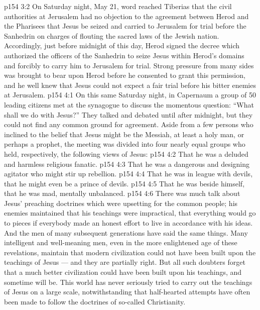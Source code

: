 \vs p154 3:2 On Saturday night, May 21, word reached Tiberias that the civil authorities at Jerusalem had no objection to the agreement between Herod and the Pharisees that Jesus be seized and carried to Jerusalem for trial before the Sanhedrin on charges of flouting the sacred laws of the Jewish nation. Accordingly, just before midnight of this day, Herod signed the decree which authorized the officers of the Sanhedrin to seize Jesus within Herod’s domains and forcibly to carry him to Jerusalem for trial. Strong pressure from many sides was brought to bear upon Herod before he consented to grant this permission, and he well knew that Jesus could not expect a fair trial before his bitter enemies at Jerusalem.
\vs p154 4:1 On this same Saturday night, in Capernaum a group of 50 leading citizens met at the synagogue to discuss the momentous question: “What shall we do with Jesus?” They talked and debated until after midnight, but they could not find any common ground for agreement. Aside from a few persons who inclined to the belief that Jesus might be the Messiah, at least a holy man, or perhaps a prophet, the meeting was divided into four nearly equal groups who held, respectively, the following views of Jesus:
\vs p154 4:2 \bibnobreakspace That he was a deluded and harmless religious fanatic.
\vs p154 4:3 \bibnobreakspace That he was a dangerous and designing agitator who might stir up rebellion.
\vs p154 4:4 \bibnobreakspace That he was in league with devils, that he might even be a prince of devils.
\vs p154 4:5 \bibnobreakspace That he was beside himself, that he was mad, mentally unbalanced.
\vs p154 4:6 \pc There was much talk about Jesus’ preaching doctrines which were upsetting for the common people; his enemies maintained that his teachings were impractical, that everything would go to pieces if everybody made an honest effort to live in accordance with his ideas. And the men of many subsequent generations have said the same things. Many intelligent and well\hyp{}meaning men, even in the more enlightened age of these revelations, maintain that modern civilization could not have been built upon the teachings of Jesus --- and they are partially right. But all such doubters forget that a much better civilization could have been built upon his teachings, and sometime will be. This world has never seriously tried to carry out the teachings of Jesus on a large scale, notwithstanding that half\hyp{}hearted attempts have often been made to follow the doctrines of so\hyp{}called Christianity.
